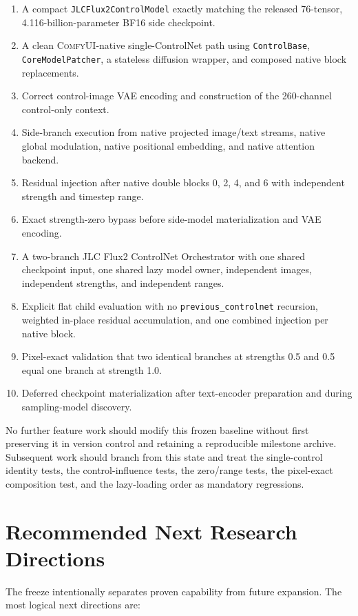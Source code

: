 \documentclass[11pt]{article}
\newcommand{\ComfyUI}{\textsc{ComfyUI}}
\newcommand{\JLC}{\textsc{JLC}}
\newcommand{\code}[1]{\texttt{#1}}
\begin{document}
\begin{enumerate}
  \item A compact \code{JLCFlux2ControlModel} exactly matching the released 76-tensor, 4.116-billion-parameter BF16 side checkpoint.
  \item A clean \ComfyUI-native single-ControlNet path using \code{ControlBase}, \code{CoreModelPatcher}, a stateless diffusion wrapper, and composed native block replacements.
  \item Correct control-image VAE encoding and construction of the 260-channel control-only context.
  \item Side-branch execution from native projected image/text streams, native global modulation, native positional embedding, and native attention backend.
  \item Residual injection after native double blocks 0, 2, 4, and 6 with independent strength and timestep range.
  \item Exact strength-zero bypass before side-model materialization and VAE encoding.
  \item A two-branch \JLC{} Flux2 ControlNet Orchestrator with one shared checkpoint input, one shared lazy model owner, independent images, independent strengths, and independent ranges.
  \item Explicit flat child evaluation with no \code{previous\_controlnet} recursion, weighted in-place residual accumulation, and one combined injection per native block.
  \item Pixel-exact validation that two identical branches at strengths 0.5 and 0.5 equal one branch at strength 1.0.
  \item Deferred checkpoint materialization after text-encoder preparation and during sampling-model discovery.
\end{enumerate}

No further feature work should modify this frozen baseline without first preserving it in version control and retaining a reproducible milestone archive. Subsequent work should branch from this state and treat the single-control identity tests, the control-influence tests, the zero/range tests, the pixel-exact composition test, and the lazy-loading order as mandatory regressions.

\section{Recommended Next Research Directions}

The freeze intentionally separates proven capability from future expansion. The most logical next directions are:
\end{document}
